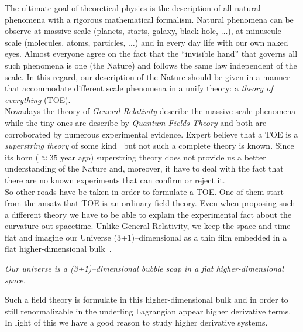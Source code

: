 The ultimate goal of theoretical physics is the description of all natural
phenomena with a rigorous mathematical formalism. Natural phenomena can be
observe at massive scale (planets, starts, galaxy, black hole, $\dots$),
at minuscule scale (molecules, atoms, particles, $\dots$) and in every day life
with our own naked eyes. Almost everyone agree on the fact that the ``invisible
hand'' that governs all such phenomena is one (the Nature) and follows the
same law independent of the scale. In this regard, our description of the Nature
should be given in a manner that accommodate different scale phenomena in a
unify theory: a \emph{theory of everything} (TOE). \\

Nowadays the theory of \emph{General Relativity} describe the massive scale
phenomena while the tiny ones are describe by \emph{Quantum Fields Theory} and
both are corroborated by numerous experimental evidence. Expert believe that a
TOE is a \emph{superstring theory} of some kind~\cite{Smilga17} but not such a
complete theory is known. Since its born ($\approx 35$ year ago) superstring
theory does not provide us a better understanding of the Nature and, moreover,
it have to deal with the fact that there are no known experiments that can
confirm or reject it. \\

So other roads have be taken in order to formulate a TOE\@. One of them start
from the ansatz that TOE is an ordinary field theory. Even when proposing such a
different theory we have to be able to explain the experimental fact about the
curvature out spacetime. Unlike General Relativity, we keep the space and time
flat and imagine our Universe (3+1)--dimensional as a thin film embedded in a
flat higher-dimensional bulk~\cite{Smilga17}.

\begin{displayquote}
  \emph{Our universe is a (3+1)--dimensional bubble soap in a flat
  higher-dimensional space.}
\end{displayquote}

Such a field theory is formulate in this higher-dimensional bulk and in order to
still renormalizable in the underling Lagrangian appear higher derivative terms.
In light of this we have a good reason to study higher derivative systems.

